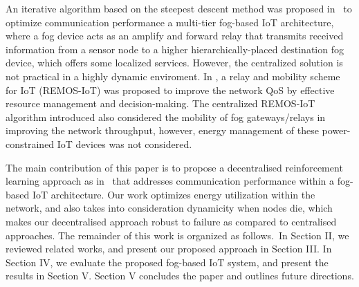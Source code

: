 \documentclass[journal]{IEEEtran}
\begin{document}
An iterative algorithm based on the steepest descent method was proposed in~\cite{OmoniwaRelay2018} to optimize communication performance a multi-tier fog-based IoT architecture, where a fog device acts as an amplify and forward relay that transmits received information from a sensor node to a higher hierarchically-placed destination fog device, which offers some localized services. However, the centralized solution is not practical in a highly dynamic enviroment. In \cite{Simiscuka2018}, a relay and mobility scheme for IoT (REMOS-IoT) was proposed to improve the network QoS by effective resource management and decision-making. The centralized REMOS-IoT algorithm introduced also considered the mobility of fog gateways/relays in improving the network throughput, however, energy management of these power-constrained IoT devices was not considered. 

%

The main contribution of this paper is to propose a decentralised reinforcement learning approach as in~\cite{Gueriau2018} that addresses communication performance within a fog-based IoT architecture. Our work optimizes energy utilization within the network, and also takes into consideration dynamicity when nodes die, which makes our decentralised approach robust to failure as compared to centralised approaches. The remainder of this work is organized as follows.~In Section II, we reviewed related works, and present our proposed approach in Section III. In Section IV, we evaluate the proposed fog-based IoT system, and present the results in Section V. Section V concludes the paper and outlines future directions.
\end{document}
